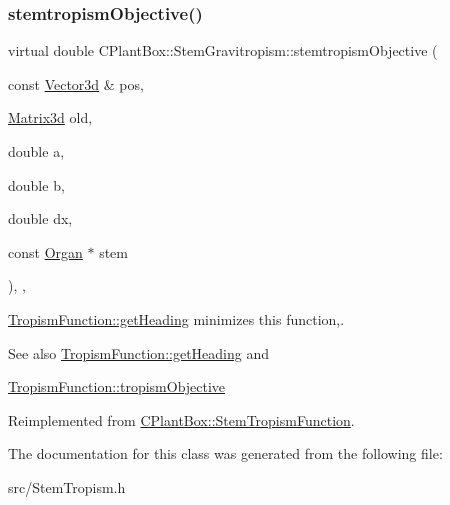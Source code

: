 \subsubsection{\texorpdfstring{stemtropism\+Objective()}{stemtropismObjective()}}
{\footnotesize\ttfamily virtual double C\+Plant\+Box\+::\+Stem\+Gravitropism\+::stemtropism\+Objective (\begin{DoxyParamCaption}\item[{const \hyperlink{classCPlantBox_1_1Vector3d}{Vector3d} \&}]{pos,  }\item[{\hyperlink{classCPlantBox_1_1Matrix3d}{Matrix3d}}]{old,  }\item[{double}]{a,  }\item[{double}]{b,  }\item[{double}]{dx,  }\item[{const \hyperlink{classCPlantBox_1_1Organ}{Organ} $\ast$}]{stem }\end{DoxyParamCaption})\hspace{0.3cm}{\ttfamily [inline]}, {\ttfamily [override]}, {\ttfamily [virtual]}}



\hyperlink{classCPlantBox_1_1TropismFunction_adb52b88734a94fe1365a00e02c7e6be5}{Tropism\+Function\+::get\+Heading} minimizes this function,. 

\begin{DoxySeeAlso}{See also}
\hyperlink{classCPlantBox_1_1TropismFunction_adb52b88734a94fe1365a00e02c7e6be5}{Tropism\+Function\+::get\+Heading} and 

\hyperlink{classCPlantBox_1_1TropismFunction_a4f2c79fff55d1398c98a070dd8ebbe08}{Tropism\+Function\+::tropism\+Objective} 
\end{DoxySeeAlso}


Reimplemented from \hyperlink{classCPlantBox_1_1StemTropismFunction_a86dc37330cbec72042352dcce88756ae}{C\+Plant\+Box\+::\+Stem\+Tropism\+Function}.



The documentation for this class was generated from the following file\+:\begin{DoxyCompactItemize}
\item 
src/Stem\+Tropism.\+h\end{DoxyCompactItemize}
